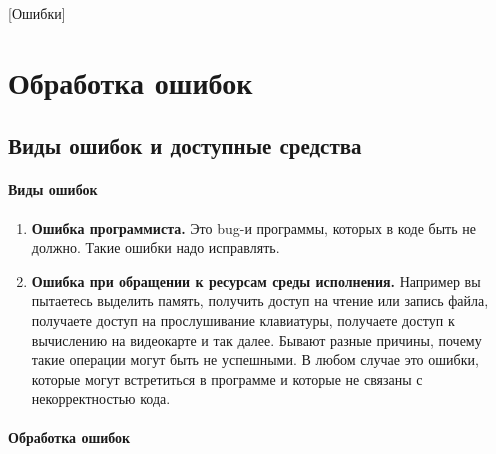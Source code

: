 [Ошибки]


\section{Обработка ошибок}

\subsection{Виды ошибок и доступные средства}

\paragraph{Виды ошибок}

\begin{enumerate}
\item \textbf{Ошибка программиста.}
Это bug-и программы, которых в коде быть не должно.
Такие ошибки надо исправлять.

\item \textbf{Ошибка при обращении к ресурсам среды исполнения.}
Например вы пытаетесь выделить память, получить доступ на чтение или запись файла, получаете доступ на прослушивание клавиатуры, получаете доступ к вычислению на видеокарте и так далее.
Бывают разные причины, почему такие операции могут быть не успешными.
В любом случае это ошибки, которые могут встретиться в  программе и которые не связаны с некорректностью кода.
\end{enumerate}

\paragraph{Обработка ошибок}


